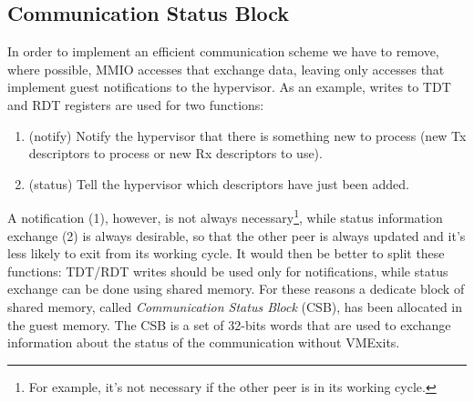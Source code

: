 \subsection{Communication Status Block}
In order to implement an efficient communication scheme we have to remove, where possible, MMIO accesses that exchange data, leaving only
accesses that implement guest notifications to the hypervisor.
As an example, writes to TDT and RDT registers are used for two functions:
\begin{enumerate}
  \item (notify) Notify the hypervisor that there is something new to process (new Tx descriptors to process or new Rx descriptors to use).
  \item (status) Tell the hypervisor which descriptors have just been added.
\end{enumerate}
A notification (1), however, is not always necessary\footnote{For example, it's not necessary if the other peer is in its working cycle.}, 
while status information exchange (2) is always desirable, so that the other peer is always updated and it's less likely to exit from its
working cycle.
It would then be better to split these functions: TDT/RDT writes should be used only for notifications, while status exchange can be done
using shared memory. For these reasons a dedicate block of shared memory, called \emph{Communication Status Block} (CSB), has been allocated
in the guest memory. The CSB is a set of 32-bits words that are used to exchange information about the status of the communication without
VMExits.

\vspace{0.5cm}

